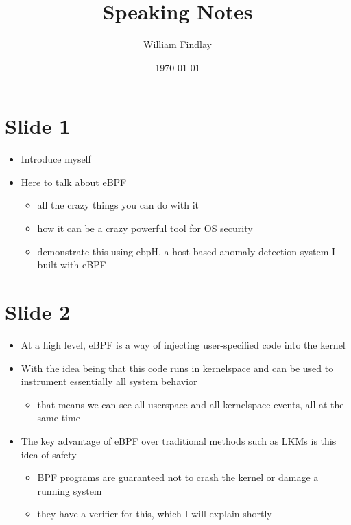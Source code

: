 \documentclass[
  12pt]{findlay}
\title{Speaking Notes}
\author{William Findlay}
\date{\today}
\providecommand{\tightlist}{\setlength{\itemsep}{0pt}\setlength{\parskip}{0pt}}
\begin{document}
\newpage
{}
\setcounter{page}{1}

\hypertarget{slide-1}{%
\section{Slide 1}\label{slide-1}}

\begin{itemize}
\tightlist
\item
  Introduce myself
\item
  Here to talk about eBPF

  \begin{itemize}
  \tightlist
  \item
    all the crazy things you can do with it
  \item
    how it can be a crazy powerful tool for OS security
  \item
    demonstrate this using ebpH, a host-based anomaly detection system I
    built with eBPF
  \end{itemize}
\end{itemize}

\hypertarget{slide-2}{%
\section{Slide 2}\label{slide-2}}

\begin{itemize}
\tightlist
\item
  At a high level, eBPF is a way of injecting user-specified code into
  the kernel
\item
  With the idea being that this code runs in kernelspace and can be used
  to instrument essentially all system behavior

  \begin{itemize}
  \tightlist
  \item
    that means we can see all userspace and all kernelspace events, all
    at the same time
  \end{itemize}
\item
  The key advantage of eBPF over traditional methods such as LKMs is
  this idea of safety

  \begin{itemize}
  \tightlist
  \item
    BPF programs are guaranteed not to crash the kernel or damage a
    running system
  \item
    they have a verifier for this, which I will explain shortly
  \end{itemize}
\end{itemize}
\end{document}
